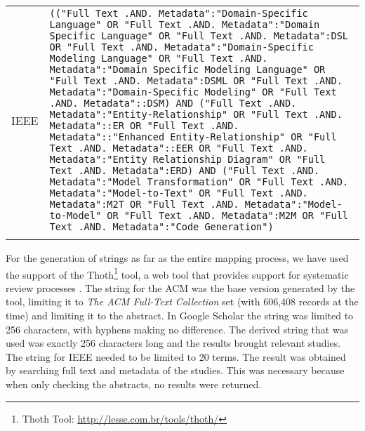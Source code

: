 \begin{table}[!htb]
\begin{tabular}{m{1.0cm}m{14.0cm}}
\T IEEE & \texttt{(("Full Text .AND. Metadata":"Domain-Specific Language" OR "Full Text .AND. Metadata":"Domain Specific Language" OR "Full Text .AND. Metadata":DSL OR "Full Text .AND. Metadata":"Domain-Specific Modeling Language" OR "Full Text .AND. Metadata":"Domain Specific Modeling Language" OR "Full Text .AND. Metadata":DSML OR "Full Text .AND. Metadata":"Domain-Specific Modeling" OR "Full Text .AND. Metadata"::DSM) \linebreak AND \linebreak ("Full Text .AND. Metadata":"Entity-Relationship" OR "Full Text .AND. Metadata"::ER OR "Full Text .AND. Metadata"::"Enhanced Entity-Relationship" OR "Full Text .AND. Metadata"::EER OR "Full Text .AND. Metadata":"Entity Relationship Diagram" OR "Full Text .AND. Metadata":ERD) \linebreak AND \linebreak ("Full Text .AND. Metadata":"Model Transformation" OR "Full Text .AND. Metadata":"Model-to-Text" OR "Full Text .AND. Metadata":M2T OR "Full Text .AND. Metadata":"Model-to-Model" OR "Full Text .AND. Metadata":M2M OR "Full Text .AND. Metadata":"Code Generation")} \\
\noalign{\smallskip} 
\toprule
\end{tabular}
\end{table}    

For the generation of strings as far as the entire mapping process, we have used the support of the Thoth\footnote{Thoth Tool: \url{http://lesse.com.br/tools/thoth/}} tool, a web tool that provides support for systematic review processes \cite{thoth:2019}.
The string for the ACM was the base version generated by the tool, limiting it to \textit{The ACM Full-Text Collection} set (with 606,408 records at the time) and limiting it to the abstract.
In Google Scholar the string was limited to 256 characters, with hyphens making no difference.
The derived string that was used was exactly 256 characters long and the results brought relevant studies.
The string for IEEE needed to be limited to 20 terms.
The result was obtained by searching full text and metadata of the studies.
This was necessary because when only checking the abstracts, no results were returned.

